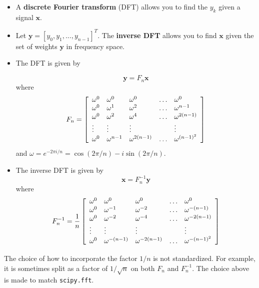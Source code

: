 \documentclass[12pt,letterpaper,noanswers]{exam}
\newcommand{\vc}[1]{\boldsymbol{#1}}
\begin{document}
\begin{tcolorbox}
\begin{itemize}
\itemsep0pt
    \item A \textbf{discrete Fourier transform} (DFT) allows you to find the $y_k$ given a signal $\vc{x}$.
    \item Let $\vc{y} = [y_0, y_1,...,y_{n-1}]^T$.  The \textbf{inverse DFT} allows you to find $\vc{x}$ given the set of weights $\vc{y}$ in frequency space.
\end{itemize}
\end{tcolorbox}
\begin{tcolorbox}
\begin{itemize}
\itemsep0pt
     \item The DFT is given by
     
    \[\vc{y} =F_n\vc{x}\] where
    \[F_n =  \left[\begin{array}{l l l l l}
    \omega^0 & \omega^0 &\omega^0 & \hdots & \omega^0 \\
    \omega^0 & \omega^{1} & \omega^{2} & \hdots & \omega^{n-1} \\
    \omega^0 & \omega^{2} & \omega^{4} & \hdots & \omega^{2(n-1)}\\
    \vdots & \vdots & \vdots & & \vdots \\
    \omega^0 & \omega^{n-1} & \omega^{2(n-1)} & \hdots &\omega^{(n-1)^2}
    \end{array}\right]\]
    and  $\omega = e^{-2\pi i/n} = \cos(2\pi/n) - i\sin(2\pi/n)$.
    \item 
    The inverse DFT is given by 
 \[\vc{x} = F_n^{-1}\vc{y}\]
 where \[F_n^{-1} = \dfrac{1}{n} \left[\begin{array}{l l l l l}
    \omega^0 & \omega^0 &\omega^0 & \hdots & \omega^0 \\
    \omega^0 & \omega^{-1} & \omega^{-2} & \hdots & \omega^{-(n-1)} \\
    \omega^0 & \omega^{-2} & \omega^{-4} & \hdots & \omega^{-2(n-1)}\\
    \vdots & \vdots & \vdots & & \vdots \\
    \omega^0 & \omega^{-(n-1)} & \omega^{-2(n-1)} & \hdots &\omega^{-(n-1)^2}
    \end{array}\right]\]
  
\end{itemize}
The choice of how to incorporate the factor $1/n$ is not standardized.  For example, it is sometimes split as a factor of $1/\sqrt{n}$ on both $F_n$ and $F_n^{-1}$.  The choice above is made to match \texttt{scipy.fft}.
\end{tcolorbox}
\end{document}
